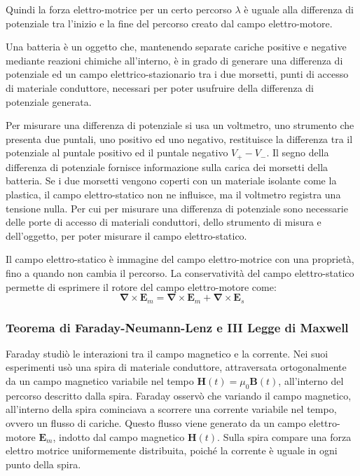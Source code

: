 \documentclass{article}
\newcommand{\vect}[1]{\boldsymbol{\mathbf{#1}}}
\numberwithin{equation}{subsection}
\begin{document}
Quindi la forza elettro-motrice per un certo percorso $\lambda$ è uguale alla differenza di potenziale tra l'inizio e la fine del percorso creato dal campo elettro-motore. 
 


Una batteria è un oggetto che, mantenendo separate cariche positive e negative mediante reazioni chimiche all'interno, è in grado di generare una differenza di potenziale 
ed un campo elettrico-stazionario tra i due morsetti, punti di accesso di materiale conduttore, necessari per poter usufruire della differenza di potenziale generata. 

Per misurare una differenza di potenziale si usa un voltmetro, uno strumento che presenta due puntali, uno positivo ed uno negativo, restituisce la differenza tra il potenziale 
al puntale positivo ed il puntale negativo $V_+-V_-$. Il segno della differenza di potenziale fornisce informazione sulla carica dei morsetti della batteria. Se i due morsetti 
vengono coperti con un materiale isolante come la plastica, il campo elettro-statico non ne influisce, ma il voltmetro registra una tensione nulla. Per cui per misurare una 
differenza di potenziale sono necessarie delle porte di accesso di materiali conduttori, dello strumento di misura e dell'oggetto, per poter misurare il campo elettro-statico. 


Il campo elettro-statico è immagine del campo elettro-motrice con una proprietà, fino a quando non cambia il percorso. La conservatività del campo elettro-statico permette 
di esprimere il rotore del campo elettro-motore come:
\begin{equation*}
    \vect\nabla\times\vect{E}_m=\vect\nabla\times\vect{E}_m+\vect\nabla\times\vect{E}_s
\end{equation*}

\subsubsection{Teorema di Faraday-Neumann-Lenz e III Legge di Maxwell}

Faraday studiò le interazioni tra il campo magnetico e la corrente. Nei suoi esperimenti usò una spira di materiale conduttore, attraversata ortogonalmente da un campo magnetico 
variabile nel tempo $\vect{H}(t)=\mu_0\vect{B}(t)$, all'interno del percorso descritto dalla spira. Faraday osservò che variando il campo magnetico, all'interno della spira 
cominciava a scorrere una corrente variabile nel tempo, ovvero un flusso di cariche. Questo flusso viene generato da un campo elettro-motore $\vect{E}_m$, indotto dal campo 
magnetico $\vect{H}(t)$. Sulla spira compare una forza elettro motrice uniformemente distribuita, poiché la corrente è uguale in ogni punto della spira. 
\end{document}
